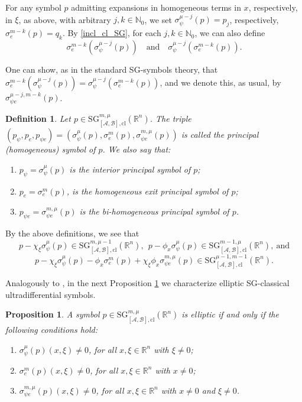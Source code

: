 \documentclass[11pt,reqno]{amsart}
\numberwithin{equation}{section}
\newtheorem{definition}[theorem]{Definition}
\newtheorem{proposition}[theorem]{Proposition}
\newcommand{\R}{{\mathbb{R}}} %
\newcommand{\N}{{\mathbb{N}}} %
\newcommand{\SG}{{\mathrm{SG}}}
\newcommand{\A}{{\mathcal{A}}} %
\newcommand{\B}{{\mathcal{B}}} %
\newcommand{\cl}{{\mathrm{cl}}}
\begin{document}
For any symbol $p$ admitting expansions in homogeneous terms in $x$, respectively, in $\xi$, as above, with arbitrary $j,k\in\N_0$,
we set $\sigma_\psi^{\mu-j}(p) = p_j$, respectively, $\sigma_e^{m-k}(p) = q_k$. By \eqref{incl_cl_SG}, for each $j,k\in\N_0$, we can also define
%
\[\sigma_e^{m-k}(\sigma_\psi^{\mu-j}(p))\quad\text{and}\quad \sigma_\psi^{\mu-j}(\sigma_e^{m-k}(p)).\]

One can show, as in the standard SG-symbols theory, that 
$\sigma_e^{m-k}(\sigma_\psi^{\mu-j}(p)) = \sigma_\psi^{\mu-j}(\sigma_e^{m-k}(p))$, and we denote this, as usual, by $\sigma_{\psi e}^{\mu-j,m-k}(p)$. 

\begin{definition}
	Let $p\in {\SG}_{[\A,\B],\mathrm{cl}}^{m,\mu}(\R^n)$. The triple $(p_\psi,p_e,p_{\psi e})=(\sigma_\psi^{\mu}(p),\sigma_e^{m}(p),\sigma_{\psi e}^{m,\mu}(p))$ 
	is called the principal (homogeneous) symbol of $p$. We also say that:
	\begin{enumerate}
		\item $p_\psi=\sigma_\psi^{\mu}(p)$ is the interior principal symbol of $p$;
		
		\item $p_e=\sigma_e^{m}(p)$, is the homogeneous exit principal symbol of $p$;
		
		\item $p_{\psi e}=\sigma_{\psi e}^{m,\mu}(p)$ is the bi-homogeneous principal symbol of $p$.
	\end{enumerate}
\end{definition}

By the above definitions, we see that
%
\begin{equation*}
	p-\chi_\xi\sigma_\psi^{\mu}(p)\in {\SG}_{[\A,\B],\cl}^{m,\mu-1}(\R^n),\ \  
	p-\phi_x\sigma_\psi^{\mu}(p)\in {\SG}_{[\A,\B],\cl}^{m-1,\mu}(\R^n),\ \text{and}
\end{equation*}
%
\begin{equation*}
	p-\chi_\xi\sigma_\psi^{\mu}(p) - \phi_x\sigma_e^{m}(p) + \chi_\xi\phi_x\sigma_{\psi e}^{m,\mu}(p) \in {\SG}_{[\A,\B],\cl}^{\mu-1,m-1}(\R^n).
\end{equation*}

Analogously to \cite[Theorem 3.2.9]{NicRod}, in the next Proposition \ref{prop:sgclell} we characterize elliptic SG-classical ultradifferential symbols.

\begin{proposition}\label{prop:sgclell}
	A symbol $p\in {\SG}_{[\A,\B],\cl}^{m,\mu}(\R^n)$ is elliptic if and only if the following conditions hold:
	\begin{enumerate}
		\item $\sigma_\psi^{\mu}(p)(x,\xi)\neq 0$, for all $x,\xi\in\R^n$ with $\xi\neq 0$;
		
		\item $\sigma_e^{m}(p)(x,\xi)\neq 0$, for all $x,\xi\in\R^n$ with $x\neq 0$;
		
		\item $\sigma_{\psi e}^{m,\mu}(p)(x,\xi)\neq 0$, for all $x,\xi\in\R^n$ with $x\neq 0$ and $\xi\neq 0$.
	\end{enumerate}
\end{proposition}
\end{document}
